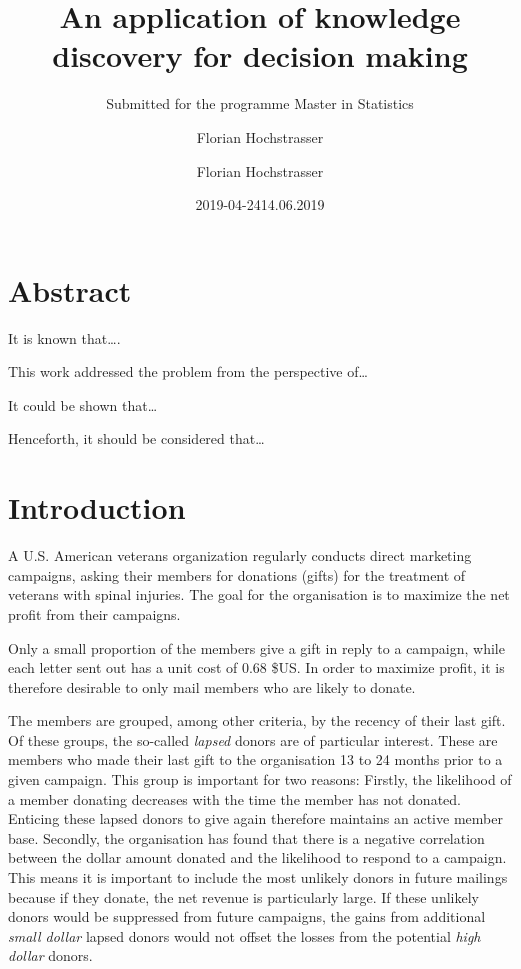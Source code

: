 \documentclass[
  11pt,
  a4paper,
  DIV=12,captions=tableheading,oneside]{scrbook}
\author{Florian Hochstrasser}
\date{2019-04-24}
\begin{document}
\begin{titlepage}

\titlehead{Master Thesis}
\subject{Profit maximisation for direct marketing campaigns}
\title{An application of knowledge discovery for decision making}
\subtitle{Submitted for the programme Master in Statistics}
\author{Florian Hochstrasser}
\date{14.06.2019}
\publishers{Supervisor: Jacques Zuber}
\extratitle{ }
\uppertitleback{Obiger Titelrückentitel}
\lowertitleback{Für dieses Beispiel wird keine Haftung übernommen.}
\dedication{Dieses Beispiel widme ich\\allen LaTeX Usern}

\end{titlepage}

{
\setcounter{tocdepth}{2}
\tableofcontents
}
\hypertarget{abstract}{%
\chapter*{Abstract}\label{abstract}}

It is known that\ldots{}.

This work addressed the problem from the perspective of\ldots{}

It could be shown that\ldots{}

Henceforth, it should be considered that\ldots{}

\hypertarget{intro}{%
\chapter{Introduction}\label{intro}}

A U.S. American veterans organization regularly conducts direct marketing campaigns, asking their members for donations (gifts) for the treatment of veterans with spinal injuries. The goal for the organisation is to maximize the net profit from their campaigns.

Only a small proportion of the members give a gift in reply to a campaign, while each letter sent out has a unit cost of 0.68 \$US. In order to maximize profit, it is therefore desirable to only mail members who are likely to donate.

The members are grouped, among other criteria, by the recency of their last gift. Of these groups, the so-called \emph{lapsed} donors are of particular interest. These are members who made their last gift to the organisation 13 to 24 months prior to a given campaign.
This group is important for two reasons: Firstly, the likelihood of a member donating decreases with the time the member has not donated. Enticing these lapsed donors to give again therefore maintains an active member base. Secondly, the organisation has found that there is a negative correlation between the dollar amount donated and the likelihood to respond to a campaign. This means it is important to include the most unlikely donors in future mailings because if they donate, the net revenue is particularly large. If these unlikely donors would be suppressed from future campaigns, the gains from additional \emph{small dollar} lapsed donors would not offset the losses from the potential \emph{high dollar} donors.
\end{document}
